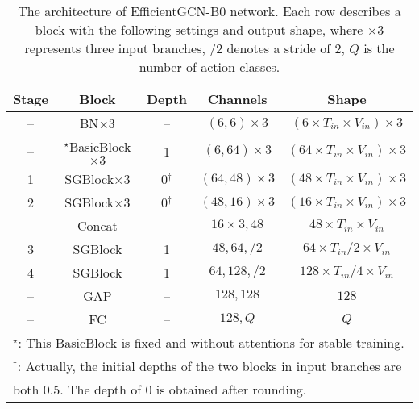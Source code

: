 \documentclass[10pt,journal,compsoc]{IEEEtran}
\begin{document}
\begin{table}[ht]
  \vspace{-0.2cm}
  \caption{The architecture of EfficientGCN-B0 network. Each row describes a block with the following settings and output shape, where $\times3$ represents three input branches, $/2$ denotes a stride of 2, $Q$ is the number of action classes.}
  \label{tab:architecture0}
  \vspace{-0.4cm}
  \centering
  \setlength{\tabcolsep}{4pt}
  \renewcommand{\arraystretch}{1.2}
  \begin{tabular}{ccccc}
  \toprule
  Stage & Block & Depth & Channels & Shape \\
  \midrule
  -- & BN$\times3$ & -- & $(6,6)\times3$ & $(6\times T_{in}\times V_{in})\times3$ \\
  -- & $^\star$BasicBlock$\times3$ & 1 & $(6,64)\times3$ & $(64\times T_{in}\times V_{in})\times3$ \\
  \hline
  1 & SGBlock$\times3$ & 0$^\dagger$ & $(64,48)\times3$ & $(48\times T_{in}\times V_{in})\times3$ \\
  2 & SGBlock$\times3$ & 0$^\dagger$ & $(48,16)\times3$ & $(16\times T_{in}\times V_{in})\times3$ \\
  \hline
  -- & Concat & -- & $16\times3, 48$ & $48\times T_{in}\times V_{in}$ \\
  \hline
  3 & SGBlock & 1 & $48,64,/2$ & $64\times T_{in}/2\times V_{in}$ \\
  4 & SGBlock & 1 & $64,128,/2$ & $128\times T_{in}/4\times V_{in}$ \\
  \hline
  -- & GAP & -- & $128,128$ & $128$ \\
  \hline
  -- & FC & -- & $128,Q$ & $Q$ \\
  \bottomrule
  \multicolumn{5}{l}{$^\star$: This BasicBlock is fixed and without attentions for stable training.}\\
  \multicolumn{5}{l}{$^\dagger$: Actually, the initial depths of the two blocks in input branches are}\\
  \multicolumn{5}{l}{both 0.5. The depth of 0 is obtained after rounding.}\\
  \end{tabular}
  \vspace{-0.2cm}
\end{table}
\end{document}
